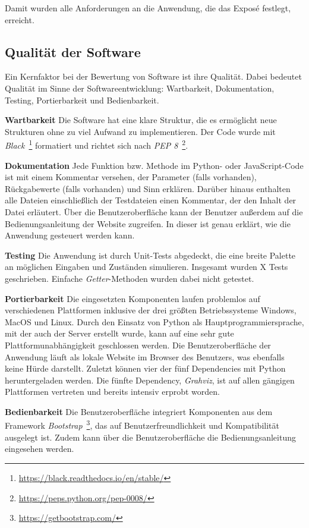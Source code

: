 Damit wurden alle Anforderungen an die Anwendung, die das Exposé festlegt, erreicht.

\subsection{Qualität der Software}

Ein Kernfaktor bei der Bewertung von Software ist ihre Qualität. Dabei bedeutet Qualität im Sinne der Softwareentwicklung: Wartbarkeit, Dokumentation, Testing, 
Portierbarkeit und Bedienbarkeit.  

\noindent\textbf{Wartbarkeit} Die Software hat eine klare Struktur, die es ermöglicht neue Strukturen ohne zu viel Aufwand zu implementieren.
Der Code wurde mit \textit{Black}~\footnote{\url{https://black.readthedocs.io/en/stable/}} formatiert und richtet sich nach \textit{PEP 8}~\footnote{\url{https://peps.python.org/pep-0008/}}.

\noindent\textbf{Dokumentation} Jede Funktion bzw. Methode im Python- oder JavaScript-Code ist mit einem Kommentar versehen, der Parameter (falls vorhanden), Rückgabewerte (falls vorhanden) und
Sinn erklären. Darüber hinaus enthalten alle Dateien einschließlich der Testdateien einen Kommentar, der den Inhalt der Datei erläutert.
Über die Benutzeroberfläche kann der Benutzer außerdem auf die Bedienungsanleitung der Website zugreifen. In dieser ist genau erklärt, wie die Anwendung gesteuert werden kann. 

\noindent\textbf{Testing} Die Anwendung ist durch Unit-Tests abgedeckt, die eine breite Palette an möglichen Eingaben und Zuständen simulieren.
Insgesamt wurden {\color{red} X} Tests geschrieben. Einfache \textit{Getter}-Methoden wurden dabei nicht getestet.

\noindent\textbf{Portierbarkeit} Die eingesetzten Komponenten laufen problemlos auf verschiedenen Plattformen inklusive der drei größten Betriebssysteme Windows, MacOS und Linux.
Durch den Einsatz von Python als Hauptprogrammiersprache, mit der auch der Server erstellt wurde, kann auf eine sehr gute Plattformunabhängigkeit geschlossen werden.
Die Benutzeroberfläche der Anwendung läuft als lokale Website im Browser des Benutzers, was ebenfalls keine Hürde darstellt. Zuletzt können vier der fünf Dependencies mit Python
heruntergeladen werden. Die fünfte Dependency, \textit{Grahviz}, ist auf allen gängigen Plattformen vertreten und bereits intensiv erprobt worden. 

\noindent\textbf{Bedienbarkeit} Die Benutzeroberfläche integriert Komponenten aus dem Framework \textit{Bootstrap}~\footnote{\url{https://getbootstrap.com/}}, das auf 
Benutzerfreundlichkeit und Kompatibilität ausgelegt ist. Zudem kann über die Benutzeroberfläche die Bedienungsanleitung eingesehen werden.

